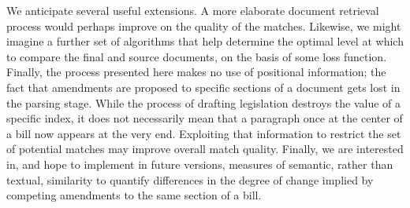 \documentclass[11pt]{article}
\begin{document}
We anticipate several useful extensions. A more elaborate document
retrieval process would perhaps improve on the quality of the
matches. Likewise, we might imagine a further set of algorithms that
help determine the optimal level at which to compare the final and
source documents, on the basis of some loss function. Finally, the
process presented here makes no use of positional information; the
fact that amendments are proposed to specific sections of a document
gets lost in the parsing stage. While the process of drafting
legislation destroys the value of a specific index, it does not
necessarily mean that a paragraph once at the center of a bill now
appears at the very end. Exploiting that information to restrict the
set of potential matches may improve overall match quality. Finally,
we are interested in, and hope to implement in future versions,
measures of semantic, rather than textual, similarity to quantify
differences in the degree of change implied by competing amendments to
the same section of a bill. 





\end{document}
